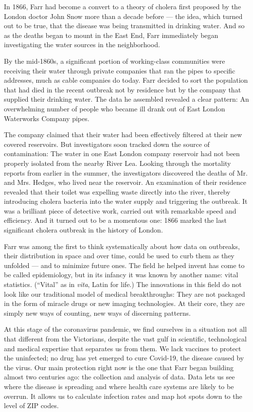 In 1866, Farr had become a convert to a theory of cholera first proposed
by the London doctor John Snow more than a decade before --- the idea,
which turned out to be true, that the disease was being transmitted in
drinking water. And so as the deaths began to mount in the East End,
Farr immediately began investigating the water sources in the
neighborhood.

By the mid-1860s, a significant portion of working-class communities
were receiving their water through private companies that ran the pipes
to specific addresses, much as cable companies do today. Farr decided to
sort the population that had died in the recent outbreak not by
residence but by the company that supplied their drinking water. The
data he assembled revealed a clear pattern: An overwhelming number of
people who became ill drank out of East London Waterworks Company pipes.

The company claimed that their water had been effectively filtered at
their new covered reservoirs. But investigators soon tracked down the
source of contamination: The water in one East London company reservoir
had not been properly isolated from the nearby River Lea. Looking
through the mortality reports from earlier in the summer, the
investigators discovered the deaths of Mr. and Mrs. Hedges, who lived
near the reservoir. An examination of their residence revealed that
their toilet was expelling waste directly into the river, thereby
introducing cholera bacteria into the water supply and triggering the
outbreak. It was a brilliant piece of detective work, carried out with
remarkable speed and efficiency. And it turned out to be a momentous
one: 1866 marked the last significant cholera outbreak in the history of
London.

Farr was among the first to think systematically about how data on
outbreaks, their distribution in space and over time, could be used to
curb them as they unfolded --- and to minimize future ones. The field he
helped invent has come to be called epidemiology, but in its infancy it
was known by another name: vital statistics. (``Vital'' as in
\emph{vita}, Latin for life.) The innovations in this field do not look
like our traditional model of medical breakthroughs: They are not
packaged in the form of miracle drugs or new imaging technologies. At
their core, they are simply new ways of counting, new ways of discerning
patterns.

At this stage of the coronavirus pandemic, we find ourselves in a
situation not all that different from the Victorians, despite the vast
gulf in scientific, technological and medical expertise that separates
us from them. We lack vaccines to protect the uninfected; no drug has
yet emerged to cure Covid-19, the disease caused by the virus. Our main
protection right now is the one that Farr began building almost two
centuries ago: the collection and analysis of data. Data lets us see
where the disease is spreading and where health care systems are likely
to be overrun. It allows us to calculate infection rates and map hot
spots down to the level of ZIP codes.

